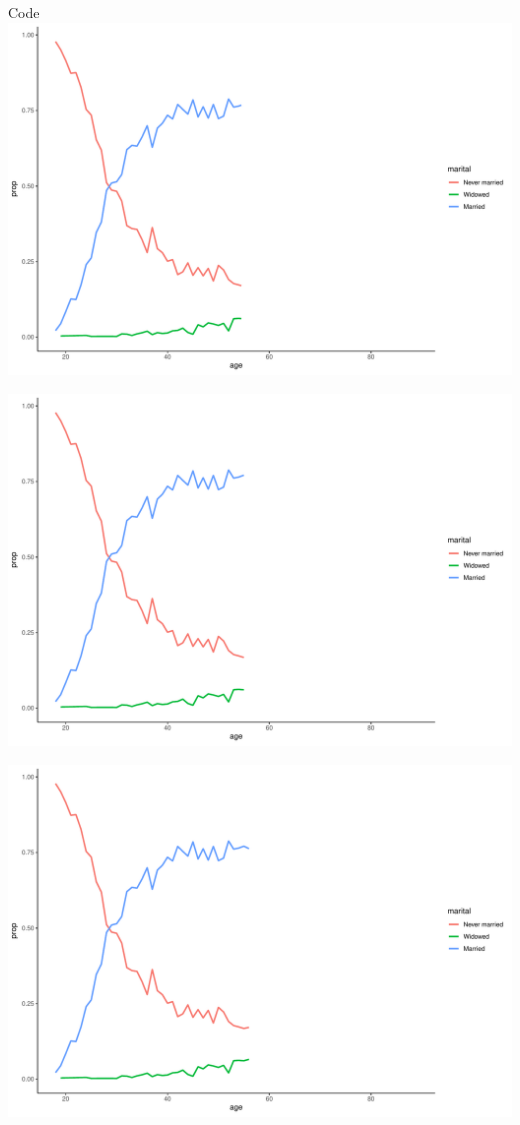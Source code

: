 \documentclass[
  ignorenonframetext,
]{beamer}
\begin{document}
\begin{frame}[fragile]{Code}
\includegraphics{gss_cat_files/figure-beamer/unnamed-chunk-1-56.pdf}

\includegraphics{gss_cat_files/figure-beamer/unnamed-chunk-1-57.pdf}

\includegraphics{gss_cat_files/figure-beamer/unnamed-chunk-1-58.pdf}


\end{frame}
\end{document}
